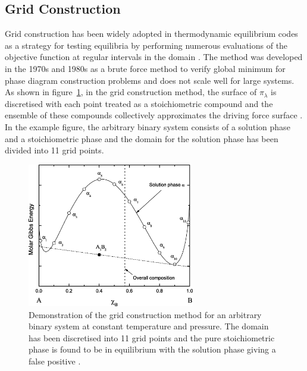 	\subsection{Grid Construction}
	Grid construction has been widely adopted in thermodynamic equilibrium codes as a strategy for testing equilibria by performing numerous evaluations of the objective function at regular intervals in the domain \cite{Shobu09,Sundman85,Sundman15,Chen93a,Chen93b}. The method was developed in the 1970s and 1980s as a brute force method to verify global minimum for phase diagram construction problems and does not scale well for large systems. As shown in figure~\ref{fig:Grid_cons}, in the grid construction method, the surface of $\pi_\lambda$ is discretised with each point treated as a stoichiometric compound and the ensemble of these compounds collectively approximates the driving force surface \cite{Piro16}. In the example figure, the arbitrary binary system consists of a solution phase and a stoichiometric phase and the domain for the solution phase has been divided into 11 grid points.
	\begin{figure}[htbp]
		\centering
		\includegraphics[width=0.65\textwidth]{figures/Grid_const}
		\caption{Demonstration of the grid construction method for an arbitrary binary system at constant temperature and pressure. The domain has been discretised into 11 grid points and the pure stoichiometric phase  is found to be in equilibrium with the solution phase giving a false positive \cite{Piro16}.}
		\label{fig:Grid_cons}
	\end{figure}

